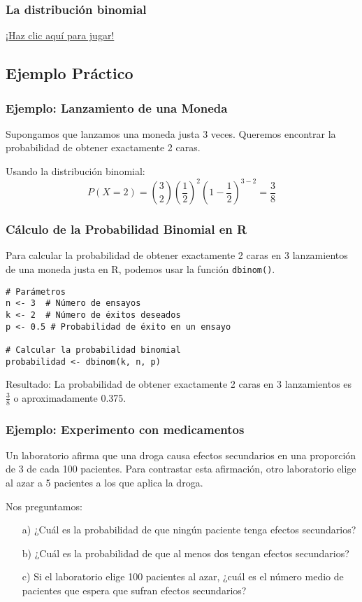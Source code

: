 \documentclass[aspectratio=169]{beamer}
\begin{document}
\begin{frame}
\frametitle{La distribución binomial}
\centering
\href{http://www.malinc.se/math/statistics/binomialen.php}{¡Haz clic aquí para jugar!}
\end{frame}



\subsection{Ejemplo Práctico}
\begin{frame}
\frametitle{Ejemplo: Lanzamiento de una Moneda}
Supongamos que lanzamos una moneda justa 3 veces. Queremos encontrar la probabilidad de obtener exactamente 2 caras.

Usando la distribución binomial:
\[
P(X=2) = \binom{3}{2} \left(\frac{1}{2}\right)^2 \left(1-\frac{1}{2}\right)^{3-2} = \frac{3}{8}
\]
\end{frame}




\begin{frame}[fragile]
\frametitle{Cálculo de la Probabilidad Binomial en R}
Para calcular la probabilidad de obtener exactamente 2 caras en 3 lanzamientos de una moneda justa en R, podemos usar la función \texttt{dbinom()}.

\begin{verbatim}
# Parámetros
n <- 3  # Número de ensayos
k <- 2  # Número de éxitos deseados
p <- 0.5 # Probabilidad de éxito en un ensayo

# Calcular la probabilidad binomial
probabilidad <- dbinom(k, n, p)
\end{verbatim}

Resultado: La probabilidad de obtener exactamente 2 caras en 3 lanzamientos es \(\frac{3}{8}\) o aproximadamente 0.375.
\end{frame}



\begin{frame}
\frametitle{Ejemplo: Experimento con medicamentos}
\begin{block}{}
Un laboratorio afirma que una droga causa efectos secundarios en una proporción de 3 de cada 100 pacientes. Para contrastar esta afirmación, otro laboratorio elige al azar a 5 pacientes a los que aplica la droga.

Nos preguntamos:
\begin{itemize}
    \item[a)] ¿Cuál es la probabilidad de que ningún paciente tenga efectos secundarios?
    \item[b)] ¿Cuál es la probabilidad de que al menos dos tengan efectos secundarios?
    \item[c)] Si el laboratorio elige 100 pacientes al azar, ¿cuál es el número medio de pacientes que espera que sufran efectos secundarios?
\end{itemize}
\end{block}
\end{frame}
\end{document}
